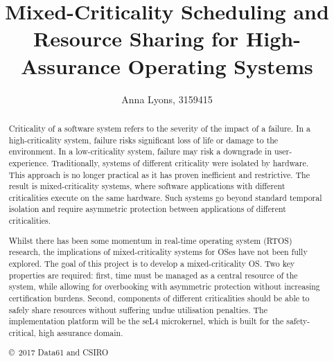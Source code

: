 \documentclass[12pt,a4paper,twoside]{report}
\date{}
\newcommand{\selfour}{seL4\xspace} %
\begin{document}



\title{Mixed-Criticality Scheduling and Resource Sharing for High-Assurance Operating Systems}
\author{Anna Lyons, 3159415}

\maketitle
{}
\thispagestyle{empty}

\begin{abstract}

Criticality of a software system refers to the severity of the impact of a failure.
In a high-criticality system, failure risks significant loss of life or damage to the environment.
In a low-criticality system, failure may risk a downgrade in user-experience.
Traditionally, systems of different criticality were isolated by hardware.
This approach is no longer practical as it has proven inefficient and restrictive.
The result is mixed-criticality systems, where software applications with different criticalities execute on the same hardware.
Such systems go beyond standard temporal isolation and require asymmetric protection between applications of different criticalities.

Whilst there has been some momentum in real-time operating system (RTOS) research, the implications of mixed-criticality systems for OSes have not been fully explored.
The goal of this project is to develop a mixed-criticality OS.
Two key properties are required: first, time must be managed as a central resource of the system, while allowing for overbooking with asymmetric protection without increasing certification burdens.
Second, components of different criticalities should be able to safely share resources without suffering undue utilisation penalties.
The implementation platform will be the \selfour microkernel, which is built for the safety-critical, high assurance domain.

\vfill

\noindent
\copyright~2017 Data61 and CSIRO
\end{abstract}
\end{document}
